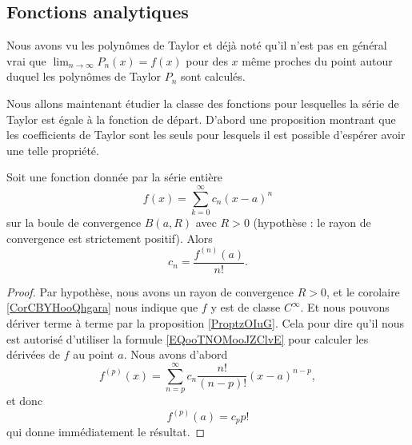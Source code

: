 \subsection{Fonctions analytiques}
\label{SUBSECooXKHWooEzqGRJ}

Nous avons vu les polynômes de Taylor et déjà noté qu'il n'est pas en général vrai que \( \lim_{n\to \infty} P_n(x)=f(x)\) pour des \( x\) même proches du point autour duquel les polynômes de Taylor \( P_n\) sont calculés.

Nous allons maintenant étudier la classe des fonctions pour lesquelles la série de Taylor est égale à la fonction de départ. D'abord une proposition montrant que les coefficients de Taylor sont les seuls pour lesquels il est possible d'espérer avoir une telle propriété.
\begin{proposition}      \label{PROPooTRWVooETTtbP}
    Soit une fonction donnée par la série entière
    \begin{equation}
        f(x)=\sum_{k=0}^{\infty}c_n(x-a)^n
    \end{equation}
    sur la boule de convergence \( B(a,R)\) avec \( R>0\) (hypothèse : le rayon de convergence est strictement positif). Alors
    \begin{equation}
        c_n=\frac{ f^{(n)}(a) }{ n! }.
    \end{equation}
\end{proposition}

\begin{proof}
    Par hypothèse, nous avons un rayon de convergence \( R>0\), et le corolaire \ref{CorCBYHooQhgara} nous indique que \( f\) y est de classe \(  C^{\infty}\). Et nous pouvons dériver terme à terme par la proposition \ref{ProptzOIuG}. Cela pour dire qu'il nous est autorisé d'utiliser la formule \eqref{EQooTNOMooJZClvE} pour calculer les dérivées de \( f\) au point \( a\). Nous avons d'abord
    \begin{equation}
        f^{(p)}(x)=\sum_{n=p}^{\infty}c_n\frac{ n! }{ (n-p)! }(x-a)^{n-p},
    \end{equation}
    et donc
    \begin{equation}
        f^{(p)}(a)=c_pp!
    \end{equation}
    qui donne immédiatement le résultat.
\end{proof}

